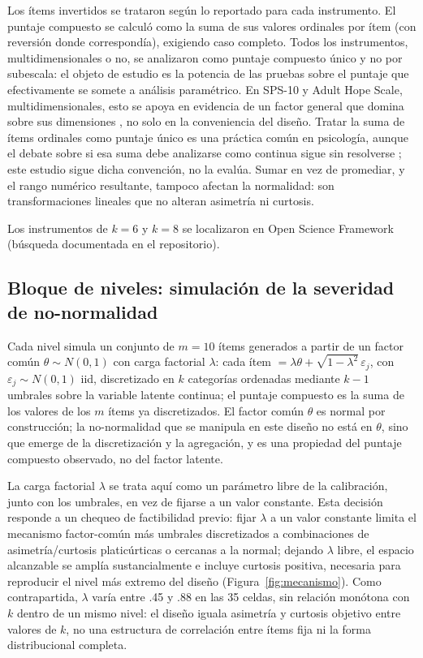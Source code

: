 \documentclass[man,mask,donotrepeattitle,floatsintext]{apa7}
\begin{document}
Los ítems invertidos se trataron según lo reportado para cada instrumento. El puntaje compuesto se calculó como la suma de sus valores ordinales por ítem (con reversión donde correspondía), exigiendo caso completo. Todos los instrumentos, multidimensionales o no, se analizaron como puntaje compuesto único y no por subescala: el objeto de estudio es la potencia de las pruebas sobre el puntaje que efectivamente se somete a análisis paramétrico. En SPS-10 y Adult Hope Scale, multidimensionales, esto se apoya en evidencia de un factor general que domina sobre sus dimensiones \parencite{sischka2025,gomez2014}, no solo en la conveniencia del diseño. Tratar la suma de ítems ordinales como puntaje único es una práctica común en psicología, aunque el debate sobre si esa suma debe analizarse como continua sigue sin resolverse \parencite{viljoen2015}; este estudio sigue dicha convención, no la evalúa. Sumar en vez de promediar, y el rango numérico resultante, tampoco afectan la normalidad: son transformaciones lineales que no alteran asimetría ni curtosis.

Los instrumentos de $k=6$ y $k=8$ se localizaron en Open Science Framework (búsqueda documentada en el repositorio).

\subsection{Bloque de niveles: simulación de la severidad de no-normalidad}
\label{sec:niveles}

Cada nivel simula un conjunto de $m=10$ ítems generados a partir de un factor común $\theta \sim N(0,1)$ con carga factorial $\lambda$: cada ítem $= \lambda\theta + \sqrt{1-\lambda^2}\,\varepsilon_j$, con $\varepsilon_j \sim N(0,1)$ iid, discretizado en $k$ categorías ordenadas mediante $k-1$ umbrales sobre la variable latente continua; el puntaje compuesto es la suma de los valores de los $m$ ítems ya discretizados. El factor común $\theta$ es normal por construcción; la no-normalidad que se manipula en este diseño no está en $\theta$, sino que emerge de la discretización y la agregación, y es una propiedad del puntaje compuesto observado, no del factor latente.

La carga factorial $\lambda$ se trata aquí como un parámetro libre de la calibración, junto con los umbrales, en vez de fijarse a un valor constante. Esta decisión responde a un chequeo de factibilidad previo: fijar $\lambda$ a un valor constante limita el mecanismo factor-común más umbrales discretizados a combinaciones de asimetría/curtosis platicúrticas o cercanas a la normal; dejando $\lambda$ libre, el espacio alcanzable se amplía sustancialmente e incluye curtosis positiva, necesaria para reproducir el nivel más extremo del diseño (Figura~\ref{fig:mecanismo}). Como contrapartida, $\lambda$ varía entre .45 y .88 en las 35 celdas, sin relación monótona con $k$ dentro de un mismo nivel: el diseño iguala asimetría y curtosis objetivo entre valores de $k$, no una estructura de correlación entre ítems fija ni la forma distribucional completa.
\end{document}
